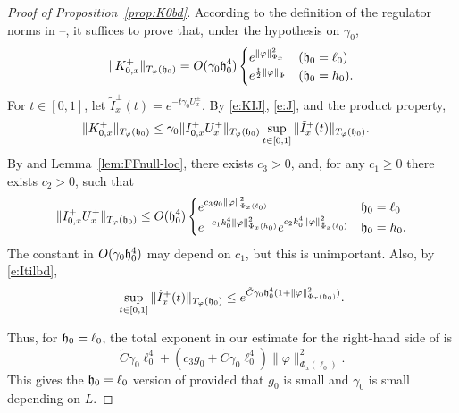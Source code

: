 \begin{proof}[Proof of Proposition~\ref{prop:K0bd}]
According to the definition of the
regulator norms in --,
it suffices to prove that, under the hypothesis on $\gamma_0$,
\begin{equation}
\label{e:K0bd}
  \|K^+_{0,x}\|_{T_\varphi(\mathfrak{h}_0)} = O(\gamma_0 \mathfrak{h}_0^4)
  \begin{cases}
  e^{\|\varphi\|_{\Phi_x}^2} & (\mathfrak{h}_0=\ell_0)
  \\
  e^{\frac{{\sf t}}{2} \|\varphi\|_{\tilde\Phi}} & (\mathfrak{h}_0=h_0).
  \end{cases}
\end{equation}
For $t \in [0,1]$, let $\tilde I^\pm_x(t) = e^{-t \gamma_0 U^\pm_x}$.
By \eqref{e:KIJ}, \eqref{e:J}, and the product property,
\begin{align}
\label{e:K0x-est}
    \|K^+_{0,x}\|_{T_\varphi(\mathfrak{h}_0)}
    & \le \gamma_0 \|I^+_{0,x} U^+_x\|_{T_\varphi(\mathfrak{h}_0)}
    \sup_{t\in [0, 1]} \|\tilde I^+_{x}(t)\|_{T_\varphi(\mathfrak{h}_0)}.
\end{align}
By  and Lemma~\ref{lem:FFnull-loc},
there exists $c_3 > 0$, and, for any $c_1 \geq 0$ there exists $c_2 > 0$, such that
\begin{equation}
\label{e:Iupper-bis}
\|I^+_{0,x} U^+_x\|_{T_\varphi(\mathfrak{h}_0)}
  \leq
O(\mathfrak{h}_0^4)
\begin{cases}
  e^{c_3 g_0  \|\varphi\|^2_{\Phi_x(\ell_0)}}
    & \mathfrak{h}_0 = \ell_0 \\
  e^{-c_1 k_0^4 \|\varphi\|^2_{\Phi_x(h_0)}} e^{c_2 k_0^4 \|\varphi\|^2_{\tilde\Phi_x(\ell_0)}}
    & \mathfrak{h}_0 = h_0.
\end{cases}
\end{equation}
The constant in $O(\gamma_0 \mathfrak{h}_0^4)$ may depend on $c_1$,
but this is unimportant.
Also, by \eqref{e:Itilbd},
\begin{equation}
\sup_{t\in[0,1]} \|\tilde I_{x}^+(t) \|_{T_\varphi(\mathfrak{h}_0)}
  \le
e^{\tilde C \gamma_0 \mathfrak{h}_0^4 (1+\|\varphi\|^2_{\Phi_x(\mathfrak{h}_0)})}.
\end{equation}

Thus, for $\mathfrak{h}_0=\ell_0$,
the total exponent in our estimate for the right-hand side of 
is
\begin{equation}
    \tilde C \gamma_0 \ell_0^4
       +(c_3 g_0 + \tilde C \gamma_0 \ell_0^4) \|\varphi\|^2_{\Phi_x(\ell_0)}
     .
\end{equation}
This gives the $\mathfrak{h}_0=\ell_0$ version of  provided that
$g_0$ is small and $\gamma_0$ is small depending on $L$.


\end{proof}
